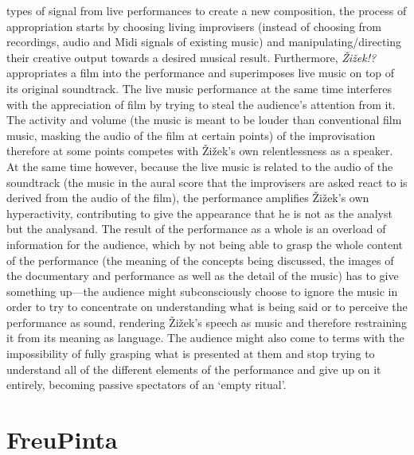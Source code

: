 types of signal from live performances to create a new composition, the process of appropriation starts by choosing living improvisers (instead of choosing  from recordings, audio and Midi signals of existing music) and manipulating/directing their creative output towards a desired musical result. Furthermore, \emph{\v{Z}i\v{z}ek!?} appropriates a film into the performance and superimposes live music on top of its original soundtrack. The live music performance at the same time interferes with the appreciation of film by trying to steal the audience's attention from it. The activity and volume (the music is meant to be louder than conventional film music, masking the audio of the film at certain points) of the improvisation therefore at some points competes with \v{Z}i\v{z}ek's own relentlessness as a speaker. At the same time however, because the live music is related to the audio of the soundtrack (the music in the aural score that the improvisers are asked react to is derived from the audio of the film), the performance amplifies \v{Z}i\v{z}ek's own hyperactivity, contributing to give the appearance that he is not as the analyst but the analysand. The result of the performance as a whole is an overload of information for the audience, which by not being able to grasp the whole content of the performance (the meaning of the concepts being discussed, the images of the documentary and performance as well as the detail of the music) has to give something up---the audience might subconsciously choose to ignore the music in order to try to concentrate on understanding what is being said or to perceive the performance as sound, rendering \v{Z}i\v{z}ek's speech as music and therefore restraining it from its meaning as language. The audience might also come to terms with the impossibility of fully grasping what is presented at them and stop trying to understand all of the different elements of the performance and give up on it entirely, becoming passive spectators of an `empty ritual'.

\section{FreuPinta}

